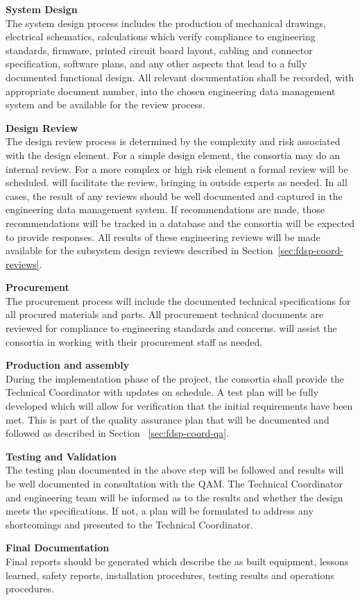 {\bf System Design}\\
The system design process includes the production of mechanical
drawings, electrical schematics, calculations which verify compliance
to engineering standards, firmware, printed circuit board layout,
cabling and connector specification, software plans, and any other
aspects that lead to a fully documented functional design.  All
relevant documentation shall be recorded, with appropriate document
number, into the chosen engineering data management system and be
available for the review process.

{\bf Design Review}\\ The design review process is determined by the
complexity and risk associated with the design element.  For a simple
design element, the consortia may do an internal review.  For a more
complex or high risk element a formal review will be scheduled.
  will facilitate the review,
bringing in outside experts as needed.  In all cases, the result of
any reviews should be well documented and captured in the engineering
data management system.  If recommendations are made, those
recommendations will be tracked in a database and the consortia will
be expected to provide responses. All results of these engineering
reviews will be made available for the subsystem design reviews
described in Section~\ref{sec:fdsp-coord-reviews}.

{\bf Procurement}\\ The procurement process will include the
documented technical specifications for all procured materials and
parts.  All procurement technical documents are reviewed for
compliance to engineering standards and  concerns.
  will assist the consortia in working with
their procurement staff as needed.

{\bf Production and assembly}\\ During the implementation phase of the project,
the consortia shall provide the Technical Coordinator with updates on
schedule.  A test plan will be fully developed which will allow for
verification that the initial requirements have been met. This is part of
the quality assurance plan that will be documented and followed as described
in Section ~\ref{sec:fdsp-coord-qa}.

{\bf Testing and Validation\\} The testing plan documented in the
above step will be followed and results will be well documented in
consultation with the QAM.  The Technical Coordinator and 
engineering team will be informed as to the results and whether the
design meets the specifications.  If not, a plan will be formulated to
address any shortcomings and presented to the Technical Coordinator.

{\bf Final Documentation\\} Final reports should be generated which
describe the as built equipment, lessons learned, safety reports,
installation procedures, testing results and operations procedures.
